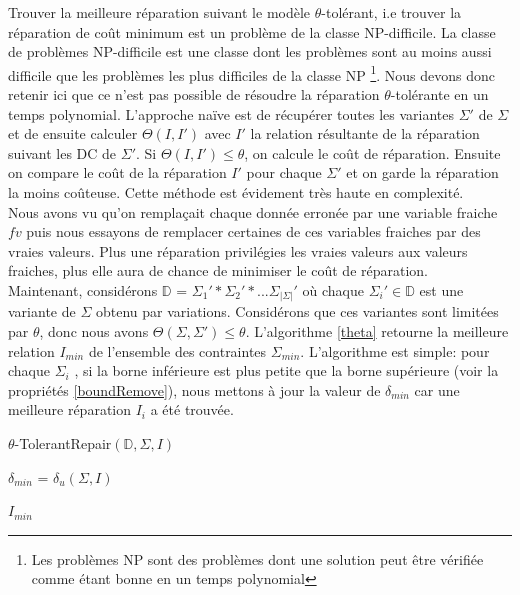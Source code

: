 \documentclass[letterpaper, 12pt]{report}
\theoremstyle{definition}
\begin{document}
Trouver la meilleure réparation suivant le modèle $\theta$-tolérant, i.e trouver la réparation de coût minimum est un problème de la classe NP-difficile. La classe de problèmes NP-difficile est une classe dont les problèmes sont au moins aussi difficile que les problèmes les plus difficiles de la classe NP \footnote{Les problèmes NP sont des problèmes dont une solution peut être vérifiée comme étant bonne en un temps polynomial}. Nous devons donc retenir ici que ce n'est pas possible de résoudre la réparation $\theta$-tolérante en un temps polynomial. L'approche naïve est de récupérer toutes les variantes $\Sigma'$ de $\Sigma$ et de ensuite calculer $\Theta(I,I')$  avec $I'$ la relation résultante de la réparation suivant les DC de $\Sigma'$. Si $\Theta(I,I') \leq \theta$, on calcule le coût de réparation. Ensuite on compare le coût de la réparation $I'$ pour chaque $\Sigma'$ et on garde la réparation la moins coûteuse. Cette méthode est évidement très haute en complexité.\\

Nous avons vu qu'on remplaçait chaque donnée erronée par une variable fraiche $fv$ puis nous essayons de remplacer certaines de ces variables fraiches par des vraies valeurs. Plus une réparation privilégies les vraies valeurs aux valeurs fraiches, plus elle aura de chance de minimiser le coût de réparation.\\

Maintenant, considérons $\mathbb{D}$ = $\Sigma_1 ' * \Sigma_2' * ... \Sigma_{|\Sigma|}'$ où chaque $\Sigma_i' \in \mathbb{D}$ est une variante de $\Sigma$ obtenu par variations. Considérons que ces variantes sont limitées par $\theta$, donc nous avons $\Theta(\Sigma,\Sigma') \leq \theta$. L'algorithme \ref{theta} retourne la meilleure relation $I_{min}$ de l'ensemble des contraintes $\Sigma_{min}$. L'algorithme est simple: pour chaque $\Sigma_i$ , si la borne inférieure est plus petite que la borne supérieure (voir la propriétés \ref{boundRemove}), nous mettons à jour la valeur de $\delta_{min}$ car une meilleure réparation $I_i$ a été trouvée. \\

\IncMargin{1em}
\begin{algorithm}
\label{theta}

	\DontPrintSemicolon
  \caption{$\theta$-TolerantRepair$(\mathbb{D},\Sigma,I)$}
  \LinesNumbered

    $\delta_{min}$ = $\delta_u(\Sigma,I)$\;

	\Return $I_{min}$

\end{algorithm}\DecMargin{1em}
\end{document}
